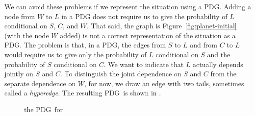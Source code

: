 \documentclass{article}
\newcommand{\MN}{PDG}
\numberwithin{equation}{section}
\begin{document}
\begin{notfocus}
\begin{example}
We can avoid these problems if we represent the situation using a
PDG.  Adding a node from $W$ to $L$ in a PDG does not require us to
give the probability of $L$ conditional on $S$, $C$, and $W$. That
said, the graph is Figure~\ref{fig:planet-initial} (with the node $W$
added) is not a correct representation of the situation as a PDG.  The
problem is that, in a PDG, the edges from $S$ to $L$ and from $C$ to
$L$ would require us to give only the probability of $L$ conditional
on $S$ and the probability of $S$ conditional on $C$.  We want to
indicate that $L$ actually depends jointly on $S$ and $C$.
To distinguish the joint dependence on
$S$ and $C$ from the separate dependence on $W$, for now, we draw an
edge with two tails, sometimes called a
\emph{hyperedge}. The resulting \MN\ is shown in
. 

		\begin{figure}
			\centering
			\caption{the \MN\ for }
			\label{fig:plannet-pdg}
		\end{figure}
	

\end{example}
\end{notfocus}
\end{document}
